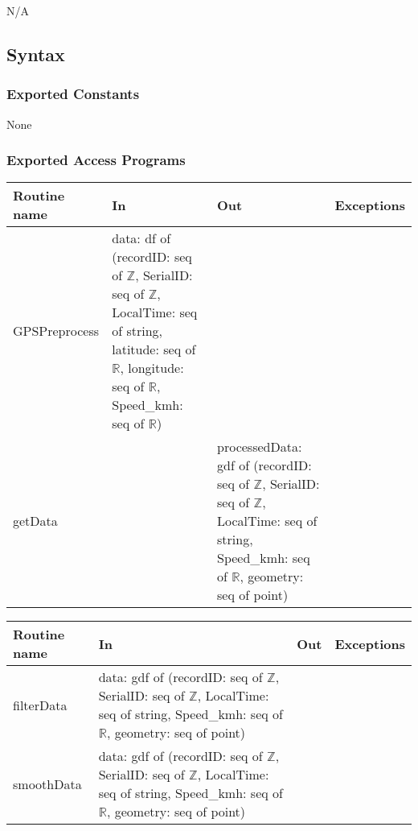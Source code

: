 \documentclass[12pt, titlepage]{article}
\begin{document}
N/A

\subsection{Syntax}

\subsubsection{Exported Constants}

None

\subsubsection{Exported Access Programs}

\begin{center}
\begin{tabular}{| l | >{\raggedright}p{4cm} | >{\raggedright}p{4cm} | l |}%
\hline
\textbf{Routine name} & \textbf{In} & \textbf{Out} & \textbf{Exceptions}\\
\hline
GPSPreprocess & data: df of (recordID: seq of $\mathbb{Z}$, SerialID: seq of $\mathbb{Z}$, LocalTime: seq of string, latitude: seq of $\mathbb{R}$, longitude: seq of $\mathbb{R}$, Speed\_kmh: seq of $\mathbb{R}$) &  & \\
\hline
getData &  & processedData: gdf of (recordID: seq of $\mathbb{Z}$, SerialID: seq of $\mathbb{Z}$, LocalTime: seq of string, Speed\_kmh: seq of $\mathbb{R}$, geometry: seq of point) & ~\\
\hline
\end{tabular}
\end{center}
\begin{center}
\begin{tabular}{| l | >{\raggedright}p{4cm} | >{\raggedright}p{4cm} | l |}%
\hline
\textbf{Routine name} & \textbf{In} & \textbf{Out} & \textbf{Exceptions}\\
\hline
filterData & data: gdf of (recordID: seq of $\mathbb{Z}$, SerialID: seq of $\mathbb{Z}$, LocalTime: seq of string, Speed\_kmh: seq of $\mathbb{R}$, geometry: seq of point) &  & ~\\
\hline
smoothData & data: gdf of (recordID: seq of $\mathbb{Z}$, SerialID: seq of $\mathbb{Z}$, LocalTime: seq of string, Speed\_kmh: seq of $\mathbb{R}$, geometry: seq of point) &  & ~\\
\hline
\end{tabular}
\end{center}
\end{document}
